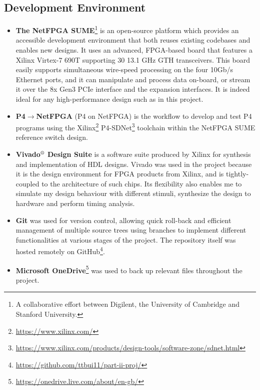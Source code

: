 \subsection{Development Environment}
\begin{itemize}%
	\item \textbf{The NetFPGA SUME}\footnote{A collaborative effort between Digilent, the University of Cambridge and Stanford University.} \cite{netfpgasume} is an open-source platform which provides an accessible development environment that both reuses existing codebases and enables new designs. It uses an advanced, FPGA-based board that features a Xilinx Virtex-7 690T supporting 30 13.1 GHz GTH transceivers. This board easily supports simultaneous wire-speed processing on the four 10Gb/s Ethernet ports, and it can manipulate and process data on-board, or stream it over the 8x Gen3 PCIe interface and the expansion interfaces. It is indeed ideal for any high-performance design such as in this project.
	
	\item \textbf{P4$\rightarrow$NetFPGA} (P4 on NetFPGA) is the workflow to develop and test P4 programs using the Xilinx\footnote{\url{https://www.xilinx.com/}} P4-SDNet\footnote{\url{https://www.xilinx.com/products/design-tools/software-zone/sdnet.html}} toolchain within the NetFPGA SUME reference switch design.
	
	\item \textbf{Vivado$^{\textrm{\textregistered}}$ Design Suite} is a software suite produced by Xilinx for synthesis and implementation of HDL designs. Vivado was used in the project because it is the design environment for FPGA products from Xilinx, and is tightly-coupled to the architecture of such chips. Its flexibility also enables me to simulate my design behaviour with different stimuli, synthesize the design to hardware and perform timing analysis.
	
	\item \textbf{Git} was used for version control, allowing quick roll-back and efficient management of multiple source trees using branches to implement different functionalities at various stages of the project. The repository itself was hosted remotely on GitHub\footnote{\url{https://github.com/ttbui11/part-ii-proj/}}.
	
	\item \textbf{Microsoft OneDrive}\footnote{\url{https://onedrive.live.com/about/en-gb/}} was used to back up relevant files throughout the project.
\end{itemize}

